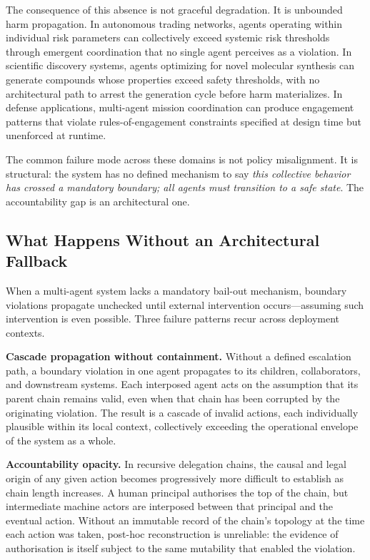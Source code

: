 The consequence of this absence is not graceful degradation. It is unbounded harm propagation. In autonomous trading networks, agents operating within individual risk parameters can collectively exceed systemic risk thresholds through emergent coordination that no single agent perceives as a violation. In scientific discovery systems, agents optimizing for novel molecular synthesis can generate compounds whose properties exceed safety thresholds, with no architectural path to arrest the generation cycle before harm materializes. In defense applications, multi-agent mission coordination can produce engagement patterns that violate rules-of-engagement constraints specified at design time but unenforced at runtime.

The common failure mode across these domains is not policy misalignment. It is structural: the system has no defined mechanism to say \textit{this collective behavior has crossed a mandatory boundary; all agents must transition to a safe state}. The accountability gap is an architectural one.

\subsection{What Happens Without an Architectural Fallback}
\label{sec:absence-of-fallback}

When a multi-agent system lacks a mandatory bail-out mechanism, boundary violations propagate unchecked until external intervention occurs—assuming such intervention is even possible. Three failure patterns recur across deployment contexts.

\textbf{Cascade propagation without containment.} Without a defined escalation path, a boundary violation in one agent propagates to its children, collaborators, and downstream systems. Each interposed agent acts on the assumption that its parent chain remains valid, even when that chain has been corrupted by the originating violation. The result is a cascade of invalid actions, each individually plausible within its local context, collectively exceeding the operational envelope of the system as a whole.

\textbf{Accountability opacity.} In recursive delegation chains, the causal and legal origin of any given action becomes progressively more difficult to establish as chain length increases. A human principal authorises the top of the chain, but intermediate machine actors are interposed between that principal and the eventual action. Without an immutable record of the chain's topology at the time each action was taken, post-hoc reconstruction is unreliable: the evidence of authorisation is itself subject to the same mutability that enabled the violation.

